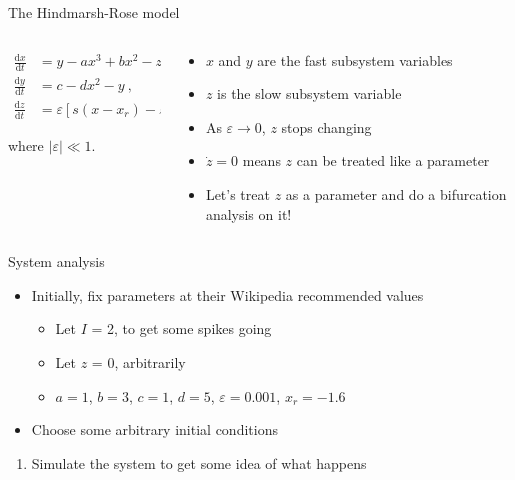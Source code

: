 \documentclass[presentation]{beamer}
\begin{document}
\begin{frame}[label={sec:org0a4afce}]{The Hindmarsh-Rose model}
\begin{columns}
\begin{column}{0.5\columnwidth}
\begin{align}
\frac{\mathrm{d}x}{\mathrm{d}t} &= y - ax^3 +bx^2 -z + I~,\nonumber \\
\frac{\mathrm{d}y}{\mathrm{d}t} &= c - dx^2 - y~,\nonumber \\
\frac{\mathrm{d}z}{\mathrm{d}t} &= \varepsilon \left[s(x-x_r)-z\right]~,\nonumber
\end{align}

where \(|\varepsilon| \ll 1\).
\end{column}

\begin{column}{0.5\columnwidth}
\begin{itemize}
\item \(x\) and \(y\) are the fast subsystem variables
\item \(z\) is the slow subsystem variable
\item As \(\varepsilon \to 0\), \(z\) stops changing
\item \(\dot{z}=0\) means \(z\) can be treated like a parameter
\item Let's treat \(z\) as a parameter and do a bifurcation analysis on it!
\end{itemize}
\end{column}
\end{columns}
\end{frame}

\begin{frame}[label={sec:org51a329d}]{System analysis}
\begin{itemize}
\item Initially, fix parameters at their Wikipedia recommended values
\begin{itemize}
\item Let \(I\) = 2, to get some spikes going
\item Let \(z\) = 0, arbitrarily
\item \(a=1\), \(b=3\), \(c=1\), \(d=5\), \(\varepsilon=0.001\), \(x_r=-1.6\)
\end{itemize}
\item Choose some arbitrary initial conditions
\end{itemize}


\begin{enumerate}
\item Simulate the system to get some idea of what happens
\end{enumerate}
\end{frame}
\end{document}
